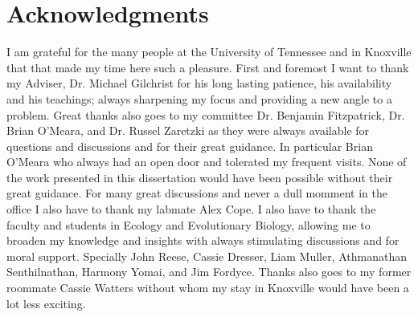 \chapter*{Acknowledgments}
I am grateful for the many people at the University of Tennessee and in Knoxville that that made my time here such a pleasure.
First and foremost I want to thank my Adviser, Dr. Michael Gilchrist for his long lasting patience, his availability and his teachings;
always sharpening my focus and providing a new angle to a problem.
Great thanks also goes to my committee Dr. Benjamin Fitzpatrick, Dr. Brian O'Meara, and Dr. Russel Zaretzki as they were always available for questions and discussions and for their great guidance.
In particular Brian O'Meara who always had an open door and tolerated my frequent visits.
None of the work presented in this dissertation would have been possible without their great guidance.
For many great discussions and never a dull momment in the office I also have to thank my labmate Alex Cope.
I also have to thank the faculty and students in Ecology and Evolutionary Biology, allowing me to broaden my knowledge and insights with always stimulating discussions and for moral support.
Specially John Reese, Cassie Dresser, Liam Muller, Athmanathan Senthilnathan, Harmony Yomai, and Jim Fordyce.
Thanks also goes to my former roommate Cassie Watters without whom my stay in Knoxville would have been a lot less exciting.
